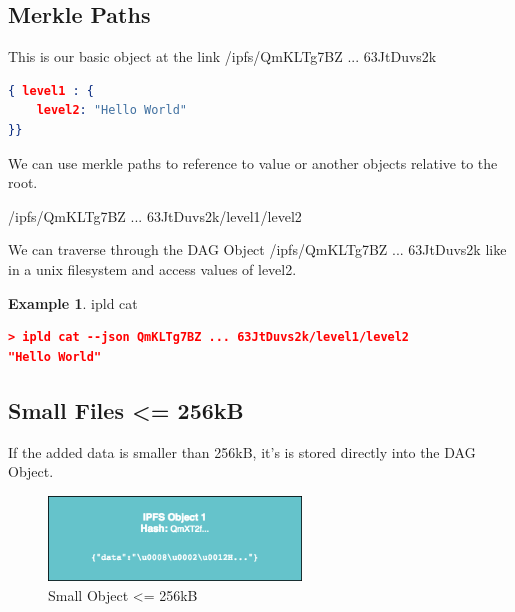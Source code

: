 \documentclass[a4paper,11pt, oneside]{report}
\theoremstyle{definition}
\newtheorem{exmp}{Example}[subsection]
\begin{document}
\subsection{Merkle Paths}
This is our basic object at the link /ipfs/QmKLTg7BZ ... 63JtDuvs2k\\
\begin{lstlisting}[language=json]
{ level1 : {
	level2: "Hello World"
}}
\end{lstlisting}
We can use merkle paths to reference to value or another objects relative to the root.
\begin{center}
/ipfs/QmKLTg7BZ ... 63JtDuvs2k/level1/level2
\end{center}
We can traverse through the DAG Object /ipfs/QmKLTg7BZ ... 63JtDuvs2k like in a unix filesystem and access values of level2.
\begin{exmp} ipld cat
\begin{lstlisting}[language=json]
> ipld cat --json QmKLTg7BZ ... 63JtDuvs2k/level1/level2
"Hello World"
\end{lstlisting}
\end{exmp}


\newpage
\subsection{Small Files <= 256kB}
If the added data is smaller than 256kB, it's is stored directly into the DAG Object.
\begin{figure}[H]
\centering
\includegraphics[width=0.6\textwidth]{img/ipfs-fileblocks-small.png}
\caption[Small Object]{Small Object <= 256kB}
\end{figure}
\end{document}
